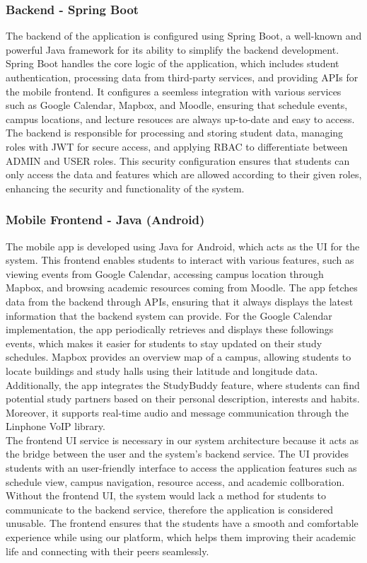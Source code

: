 \documentclass[12pt]{article}
\begin{document}
\pagebreak

\subsubsection{Backend - Spring Boot}
The backend of the application is configured using Spring Boot, a well-known and powerful Java framework for its ability to simplify the backend development.
Spring Boot handles the core logic of the application, which includes student authentication, processing data from third-party services, and providing APIs for the mobile frontend.
It configures a seemless integration with various services such as Google Calendar, Mapbox, and Moodle, ensuring that schedule events, campus locations, and lecture resouces are always up-to-date and easy to access.
The backend is responsible for processing and storing student data, managing roles with JWT for secure access, and applying RBAC to differentiate between ADMIN and USER roles.
This security configuration ensures that students can only access the data and features which are allowed according to their given roles, enhancing the security and functionality of the system.

\subsubsection{Mobile Frontend - Java (Android)}
The mobile app is developed using Java for Android, which acts as the UI for the system.
This frontend enables students to interact with various features, such as viewing events from Google Calendar, accessing campus location through Mapbox, and browsing academic resources coming from Moodle.
The app fetches data from the backend through APIs, ensuring that it always displays the latest information that the backend system can provide.
For the Google Calendar implementation, the app periodically retrieves and displays these followings events, which makes it easier for students to stay updated on their study schedules.
Mapbox provides an overview map of a campus, allowing students to locate buildings and study halls using their latitude and longitude data.
Additionally, the app integrates the StudyBuddy feature, where students can find potential study partners based on their personal description, interests and habits. 
Moreover, it supports real-time audio and message communication through the Linphone VoIP library. \\

The frontend UI service is necessary in our system architecture because it acts as the bridge between the user and the system's backend service. The UI provides students with an user-friendly interface to access the application features such as schedule view, campus navigation, resource access, and academic collboration.
Without the frontend UI, the system would lack a method for students to communicate to the backend service, therefore the application is considered unusable. 
The frontend ensures that the students have a smooth and comfortable experience while using our platform, which helps them improving their academic life and connecting with their peers seamlessly.
\end{document}
